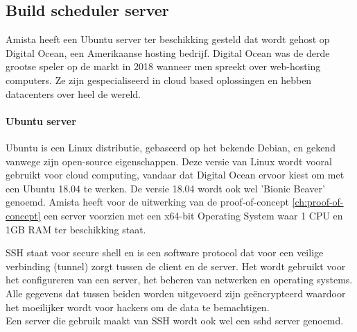         \subsection{Build scheduler server}
        Amista heeft een Ubuntu server ter beschikking gesteld dat wordt gehost op Digital Ocean, een Amerikaanse hosting bedrijf. Digital Ocean was de derde grootse speler op de markt in 2018 wanneer men spreekt over web-hosting computers. Ze zijn gespecialiseerd in cloud based oplossingen en hebben datacenters over heel de wereld.
            
            \paragraph{Ubuntu server}
            Ubuntu is een Linux distributie, gebaseerd op het bekende Debian, en gekend vanwege zijn open-source eigenschappen.
            Deze versie van Linux wordt vooral gebruikt voor cloud computing, vandaar dat Digital Ocean ervoor kiest om met een Ubuntu 18.04 te werken.
            De versie 18.04 wordt ook wel 'Bionic Beaver' genoemd.
            Amista heeft voor de uitwerking van de proof-of-concept \ref{ch:proof-of-concept} een server voorzien met een x64-bit Operating System waar 1 CPU en 1GB RAM ter beschikking staat.
            
            SSH staat voor secure shell en is een software protocol dat voor een veilige verbinding (tunnel) zorgt tussen de client en de server. Het wordt gebruikt voor het configureren van een server, het beheren van netwerken en operating systems. Alle gegevens dat tussen beiden worden uitgevoerd zijn geëncrypteerd waardoor het moeilijker wordt voor hackers om de data te bemachtigen.\\
            Een server die gebruik maakt van SSH wordt ook wel een sshd server genoemd. 
            
%            
            
